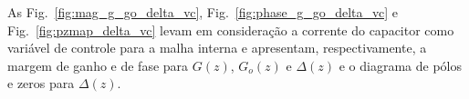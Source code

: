   \newpage

  \vspace*{\fill}
  \noindent
  \begin{minipage}{\textwidth}
    \makebox[\textwidth]{
      \centering
      \def\svgwidth{\textwidth}
      }
    \label{fig:phase_g_go_delta_ic}
  \end{minipage}

  \vspace{\fill}
  \noindent
  \begin{minipage}{\textwidth}
    \makebox[\textwidth]{
      \centering
      \def\svgwidth{\textwidth}
      }
    \label{fig:pzmap_delta_ic}
  \end{minipage}
  \vspace{\fill}

  \newpage


  As Fig.~\ref{fig:mag_g_go_delta_vc}, Fig.~\ref{fig:phase_g_go_delta_vc} e Fig.~\ref{fig:pzmap_delta_vc} levam em consideração a corrente do capacitor como variável de controle para a malha interna e apresentam, respectivamente, a margem de ganho e de fase para $G(z)$, $G_o(z)$ e $\Delta(z)$ e o diagrama de pólos e zeros para $\Delta(z)$.

  \vspace{\fill}
  \noindent
  \begin{minipage}{\textwidth}
    \makebox[\textwidth]{
      \centering
      \def\svgwidth{\textwidth}
      }
    \label{fig:mag_g_go_delta_vc}
  \end{minipage}

